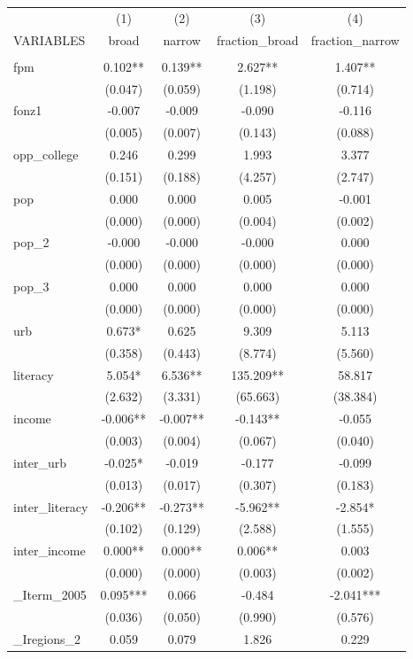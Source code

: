 \documentclass[]{article}
\begin{document}
\begin{tabular}{lcccc} \hline
 & (1) & (2) & (3) & (4) \\
VARIABLES & broad & narrow & fraction\_broad & fraction\_narrow \\ \hline
 &  &  &  &  \\
fpm & 0.102** & 0.139** & 2.627** & 1.407** \\
 & (0.047) & (0.059) & (1.198) & (0.714) \\
fonz1 & -0.007 & -0.009 & -0.090 & -0.116 \\
 & (0.005) & (0.007) & (0.143) & (0.088) \\
opp\_college & 0.246 & 0.299 & 1.993 & 3.377 \\
 & (0.151) & (0.188) & (4.257) & (2.747) \\
pop & 0.000 & 0.000 & 0.005 & -0.001 \\
 & (0.000) & (0.000) & (0.004) & (0.002) \\
pop\_2 & -0.000 & -0.000 & -0.000 & 0.000 \\
 & (0.000) & (0.000) & (0.000) & (0.000) \\
pop\_3 & 0.000 & 0.000 & 0.000 & 0.000 \\
 & (0.000) & (0.000) & (0.000) & (0.000) \\
urb & 0.673* & 0.625 & 9.309 & 5.113 \\
 & (0.358) & (0.443) & (8.774) & (5.560) \\
literacy & 5.054* & 6.536** & 135.209** & 58.817 \\
 & (2.632) & (3.331) & (65.663) & (38.384) \\
income & -0.006** & -0.007** & -0.143** & -0.055 \\
 & (0.003) & (0.004) & (0.067) & (0.040) \\
inter\_urb & -0.025* & -0.019 & -0.177 & -0.099 \\
 & (0.013) & (0.017) & (0.307) & (0.183) \\
inter\_literacy & -0.206** & -0.273** & -5.962** & -2.854* \\
 & (0.102) & (0.129) & (2.588) & (1.555) \\
inter\_income & 0.000** & 0.000** & 0.006** & 0.003 \\
 & (0.000) & (0.000) & (0.003) & (0.002) \\
\_Iterm\_2005 & 0.095*** & 0.066 & -0.484 & -2.041*** \\
 & (0.036) & (0.050) & (0.990) & (0.576) \\
\_Iregions\_2 & 0.059 & 0.079 & 1.826 & 0.229 \\

\end{tabular}
\end{document}
